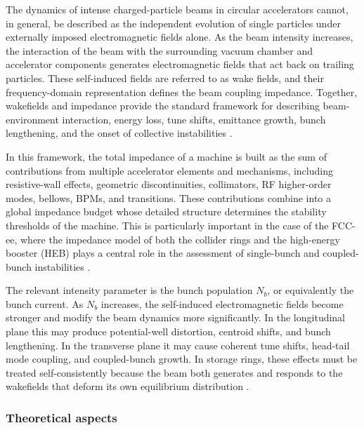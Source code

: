 \documentclass[11pt,a4paper]{article}
\begin{document}
\begin{sloppypar}
The dynamics of intense charged-particle beams in circular accelerators cannot, in general, be described as the independent evolution of single particles under externally imposed electromagnetic fields alone. As the beam intensity increases, the interaction of the beam with the surrounding vacuum chamber and accelerator components generates electromagnetic fields that act back on trailing particles. These self-induced fields are referred to as wake fields, and their frequency-domain representation defines the beam coupling impedance. Together, wakefields and impedance provide the standard framework for describing beam-environment interaction, energy loss, tune shifts, emittance growth, bunch lengthening, and the onset of collective instabilities \cite{metral_wake_2021-1,ghribi_impact_nodate,gibellieri_impact_nodate}.

In this framework, the total impedance of a machine is built as the sum of contributions from multiple accelerator elements and mechanisms, including resistive-wall effects, geometric discontinuities, collimators, RF higher-order modes, bellows, BPMs, and transitions. These contributions combine into a global impedance budget whose detailed structure determines the stability thresholds of the machine. This is particularly important in the case of the FCC-ee, where the impedance model of both the collider rings and the high-energy booster (HEB) plays a central role in the assessment of single-bunch and coupled-bunch instabilities \cite{ghribi_impact_nodate,gibellieri_impact_nodate}.

The relevant intensity parameter is the bunch population $N_b$, or equivalently the bunch current. As $N_b$ increases, the self-induced electromagnetic fields become stronger and modify the beam dynamics more significantly. In the longitudinal plane this may produce potential-well distortion, centroid shifts, and bunch lengthening. In the transverse plane it may cause coherent tune shifts, head-tail mode coupling, and coupled-bunch growth. In storage rings, these effects must be treated self-consistently because the beam both generates and responds to the wakefields that deform its own equilibrium distribution \cite{metral_wake_2021-1,zhou_theories_2023}.

\subsubsection{Theoretical aspects}


\end{sloppypar}
\end{document}
